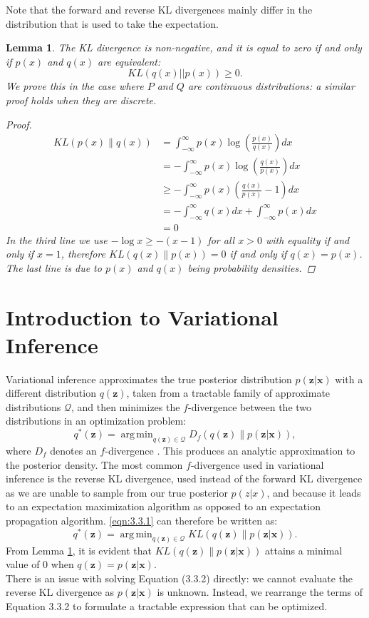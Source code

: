 \documentclass[honours,12pt]{unswthesis}
\DeclareMathOperator*{\argmin}{arg\,min}
\newtheorem{lemma}[theorem]{Lemma}
\numberwithin{equation}{section}
\theoremstyle{definition}
\begin{document}
Note that the forward and reverse KL divergences mainly differ in the distribution that is used to take the expectation.
\begin{lemma}\label{3.2.5}
The KL divergence is non-negative, and it is equal to zero if and only if $p(x)$ and $q(x)$ are equivalent:
\begin{equation*}
KL(q(x)||p(x))\geq 0.
\end{equation*}
We prove this in the case where $P$ and $Q$ are continuous distributions: a similar proof holds when they are discrete.
\begin{proof}
\begin{align*}
KL(p(x)\|q(x))&=\int_{-\infty}^\infty p(x)\log \left(\frac{p(x)}{q(x)}\right)dx\\
&=-\int_{-\infty}^\infty p(x)\log \left(\frac{q(x)}{p(x)}\right)dx\\
&\geq -\int_{-\infty}^\infty p(x) \left(\frac{q(x)}{p(x)}-1\right)dx\\
&=-\int_{-\infty}^\infty q(x)dx + \int_{-\infty}^\infty p(x)dx\\
&=0
\end{align*}
In the third line we use $-\log x \geq -(x-1)$ for all $x>0$ with equality if and only if $x=1$, therefore $KL(q(x)\|p(x))=0$ if and only if $q(x)=p(x)$. The last line is due to $p(x)$ and $q(x)$ being probability densities.
\end{proof}
\end{lemma}
\section{Introduction to Variational Inference}\label{sec:3.3}
Variational inference approximates the true posterior distribution $p(\bm{z}|\bm{x})$ with a different distribution $q(\bm{z})$, taken from a tractable family of approximate distributions $\mathcal{Q}$, and then minimizes the $f$-divergence between the two distributions in an optimization problem:
\begin{equation}\label{eqn:3.3.1}
q^*(\bm{z})=\argmin_{q(\bm{z})\in \mathcal{Q}}D_f(q(\bm{z})\|p(\bm{z}|\bm{x})),
\end{equation} where $D_f$ denotes an $f$-divergence \citep{blei}. This produces an analytic approximation to the posterior density. The most common $f$-divergence used in variational inference is the reverse KL divergence, used instead of the forward KL divergence as we are unable to sample from our true posterior $p(z|x)$, and because it leads to an expectation maximization algorithm as opposed to an expectation propagation algorithm. \autoref{eqn:3.3.1} can therefore be written as:
\begin{equation}\label{eqn:3.3.2}
q^*(\bm{z})=\argmin_{q(\bm{z})\in \mathcal{Q}}KL(q(\bm{z})\|p(\bm{z}|\bm{x})).
\end{equation}
From Lemma \ref{3.2.5}, it is evident that $KL(q(\bm{z})\|p(\bm{z}|\bm{x}))$ attains a minimal value of $0$ when $q(\bm{z})=p(\bm{z}|\bm{x})$.\\
There is an issue with solving Equation (3.3.2) directly: we cannot evaluate the reverse KL divergence as $p(\bm{z}|\bm{x})$ is unknown. Instead, we rearrange the terms of Equation 3.3.2 to formulate a tractable expression that can be optimized.
\end{document}
